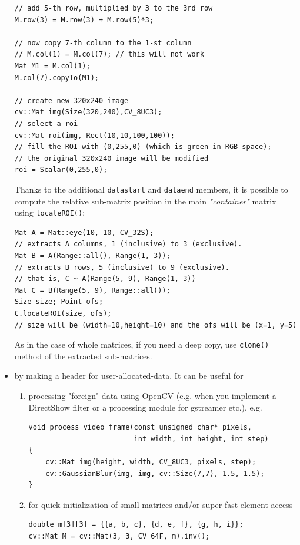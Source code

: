 \begin{itemize}
\begin{lstlisting}
// add 5-th row, multiplied by 3 to the 3rd row
M.row(3) = M.row(3) + M.row(5)*3;

// now copy 7-th column to the 1-st column
// M.col(1) = M.col(7); // this will not work
Mat M1 = M.col(1);
M.col(7).copyTo(M1);

// create new 320x240 image
cv::Mat img(Size(320,240),CV_8UC3);
// select a roi
cv::Mat roi(img, Rect(10,10,100,100));
// fill the ROI with (0,255,0) (which is green in RGB space);
// the original 320x240 image will be modified
roi = Scalar(0,255,0);
\end{lstlisting}

      Thanks to the additional \texttt{datastart} and \texttt{dataend} members, it is possible to
      compute the relative sub-matrix position in the main \emph{"container"} matrix using \texttt{locateROI()}:
      
\begin{lstlisting}
Mat A = Mat::eye(10, 10, CV_32S);
// extracts A columns, 1 (inclusive) to 3 (exclusive).
Mat B = A(Range::all(), Range(1, 3));
// extracts B rows, 5 (inclusive) to 9 (exclusive).
// that is, C ~ A(Range(5, 9), Range(1, 3))
Mat C = B(Range(5, 9), Range::all());
Size size; Point ofs;
C.locateROI(size, ofs);
// size will be (width=10,height=10) and the ofs will be (x=1, y=5)
\end{lstlisting}
          
      As in the case of whole matrices, if you need a deep copy, use \texttt{clone()} method
      of the extracted sub-matrices.
          
\item by making a header for user-allocated-data. It can be useful for
    \begin{enumerate}
        \item processing "foreign" data using OpenCV (e.g. when you implement
        a DirectShow filter or a processing module for gstreamer etc.), e.g.
            
\begin{lstlisting}
void process_video_frame(const unsigned char* pixels,
                         int width, int height, int step)
{
    cv::Mat img(height, width, CV_8UC3, pixels, step);
    cv::GaussianBlur(img, img, cv::Size(7,7), 1.5, 1.5);
}
\end{lstlisting}
            
        \item for quick initialization of small matrices and/or super-fast element access
\begin{lstlisting}
double m[3][3] = {{a, b, c}, {d, e, f}, {g, h, i}};
cv::Mat M = cv::Mat(3, 3, CV_64F, m).inv();
\end{lstlisting}
        \end{enumerate}
        

\end{itemize}
